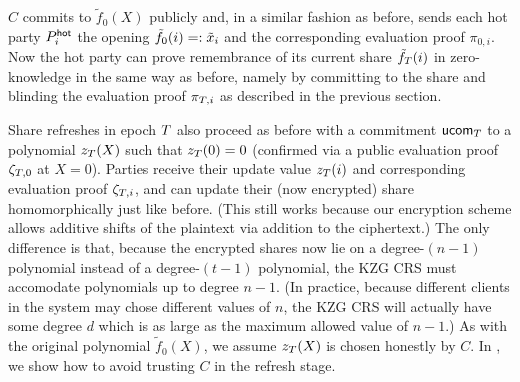 $C$ commits to $\tilde{f}_0(X)$ publicly and, in a similar fashion as before, sends each hot party $P_i^{\mathsf{hot}}$ the opening $\tilde{f}_0(i) =: \tilde{x}_i$ and the corresponding evaluation proof $\pi_{0,i}$. Now the hot party can prove remembrance of its current share $\tilde{f}_{T}(i)$ in zero-knowledge in the same way as before, namely by committing to the share and blinding the evaluation proof $\pi_{T,i}$ as described in the previous section.

Share refreshes in epoch $T$ also proceed as before with a commitment $\mathsf{ucom}_{T}$ to a polynomial $z_{T}(X)$ such that $z_{T}(0) = 0$ (confirmed via a public evaluation proof $\zeta_{T,0}$ at $X=0$). Parties receive their update value $z_{T}(i)$ and corresponding evaluation proof $\zeta_{T,i}$, and can update their (now encrypted) share homomorphically just like before. (This still works because our encryption scheme allows additive shifts of the plaintext via addition to the ciphertext.) The only difference is that, because the encrypted shares now lie on a degree-$(n-1)$ polynomial instead of a degree-$(t-1)$ polynomial, the KZG CRS must accomodate polynomials up to degree $n-1$. (In practice, because different clients in the system may chose different values of $n$, the KZG CRS will actually have some degree $d$ which is as large as the maximum allowed value of $n-1$.) As with the original polynomial $\tilde{f}_0(X)$, we assume $z_{T}(X)$ is chosen honestly by $C$. In , we show how to avoid trusting $C$ in the refresh stage.


